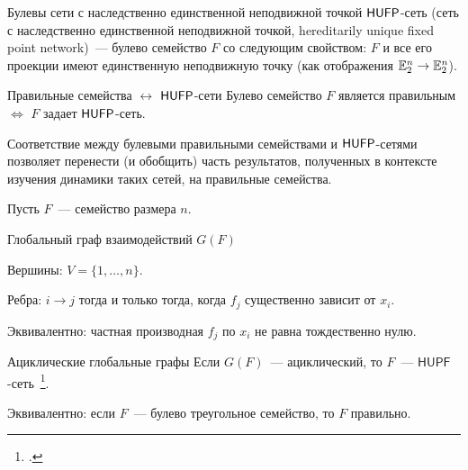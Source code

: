 \begin{frame}%
    \begin{myexample}{Булевы сети с наследственно единственной неподвижной точкой}
        $\mathsf{HUFP}$-сеть (сеть с наследственно единственной неподвижной точкой, hereditarily unique fixed point network)~--- булево семейство $F$ со следующим свойством: $F$ и все его проекции имеют единственную неподвижную точку (как отображения $\mathbb{E}_2^n \to \mathbb{E}_2^n$).
    \end{myexample}
    \pause 
    \begin{mytheorem}{Правильные семейства $\leftrightarrow$ $\mathsf{HUFP}$-сети}
        Булево семейство $F$ является правильным $\Leftrightarrow$ $F$ задает $\mathsf{HUFP}$-сеть. 
    \end{mytheorem}
    \pause
    Соответствие между булевыми правильными семействами и $\mathsf{HUFP}$-сетями позволяет перенести (и обобщить) часть результатов, полученных в контексте изучения динамики таких сетей, на правильные семейства.
\end{frame}


\begin{frame}%
    Пусть $F$~--- семейство размера $n$.
    \begin{myexample}{Глобальный граф взаимодействий $G(F)$}
        \begin{coloritemize}
        \item Вершины: $V = \{1, \ldots, n\}$.
        \item Ребра: $i \to j$ тогда и только тогда, когда $f_j$ существенно зависит от $x_i$.
        \item Эквивалентно:  частная производная $f_j$ по $x_i$ не равна тождественно нулю.
        \end{coloritemize}
    \end{myexample}
    \pause
    \begin{mypropos}{Ациклические глобальные графы}
        Если $G(F)$~--- ациклический, то $F$~--- $\mathsf{HUPF}$-сеть~\footcite{robert1980iterations}.
    \end{mypropos}
    \pause 
    Эквивалентно: если $F$~--- булево треугольное семейство, то $F$ правильно.
\end{frame}


